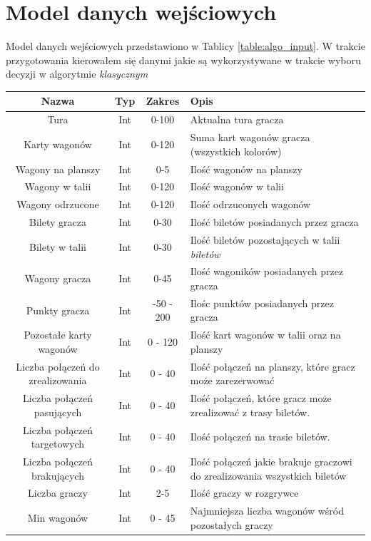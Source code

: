 \documentclass[12pt, oneside]{report}
\begin{document}
\section{Model danych wejściowych}
Model danych wejściowych przedstawiono w Tablicy \ref{table:algo_input}. W trakcie przygotowania kierowałem się danymi jakie są wykorzystywane w trakcie wyboru decyzji w algorytmie \textit{klasycznym}

\begin{longtable}[h]{| c | c | c | p{6.5cm} |} \hline
	Nazwa & Typ & Zakres & Opis \\ \hline	
	Tura & Int & 0-100 & Aktualna tura gracza \\ \hline
	Karty wagonów & Int & 0-120 & Suma kart wagonów gracza (wszystkich kolorów) \\ \hline
	Wagony na planszy & Int & 0-5 & Ilość wagonów na planszy \\ \hline
	Wagony w talii & Int & 0-120 & Ilość wagonów w talii \\ \hline
	Wagony odrzucone & Int & 0-120 & Ilość odrzuconych wagonów \\ \hline
	Bilety gracza & Int & 0-30 & Ilość biletów posiadanych przez gracza \\ \hline
	Bilety w talii & Int & 0-30 & Ilość biletów pozostających w talii \textit{biletów} \\ \hline
	Wagony gracza & Int & 0-45 & Ilość wagoników posiadanych przez gracza \\ \hline
	Punkty gracza & Int & -50 - 200 & Ilośc punktów posiadanych przez gracza \\ \hline
	Pozostałe karty wagonów & Int & 0 - 120 & Ilość kart wagonów w talii oraz na planszy  \\ \hline
	Liczba połączeń do zrealizowania & Int & 0 - 40 & Ilość połączeń na planszy, które gracz może zarezerwować \\ \hline
	Liczba połączeń pasujących & Int & 0 - 40 & Ilość połączeń, które gracz może zrealizować z trasy biletów. \\ \hline
	Liczba połączeń targetowych & Int & 0 - 40 & Ilość połączeń na trasie biletów. \\ \hline
	Liczba połączeń brakujących & Int & 0 - 40 & Ilość połączeń jakie brakuje graczowi do zrealizowania wszystkich biletów \\ \hline
	Liczba graczy & Int & 2-5 & Ilość graczy w rozgrywce \\ \hline
	Min wagonów  & Int & 0 - 45 & Najmniejsza liczba wagonów wśród pozostałych graczy \\ \hline

\end{longtable}
\end{document}

